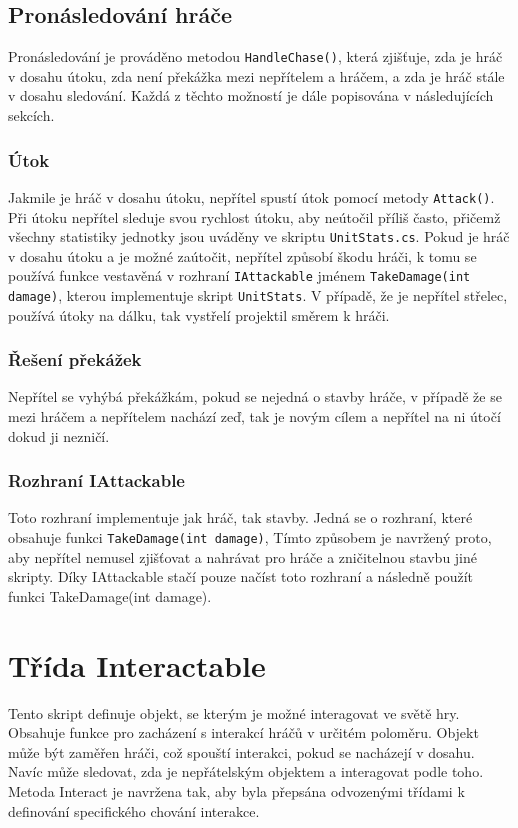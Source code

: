 \subsection{Pronásledování hráče}
Pronásledování je prováděno metodou \texttt{HandleChase()}, která zjišťuje, zda je hráč v dosahu útoku, zda není překážka mezi nepřítelem a hráčem, a zda je hráč stále v dosahu sledování. Každá z těchto možností je dále popisována v následujících sekcích.

\subsubsection{Útok}
Jakmile je hráč v dosahu útoku, nepřítel spustí útok pomocí metody \texttt{Attack()}. Při útoku nepřítel sleduje svou rychlost útoku, aby neútočil příliš často, přičemž všechny statistiky jednotky jsou uváděny ve skriptu \texttt{UnitStats.cs}. Pokud je hráč v dosahu útoku a je možné zaútočit, nepřítel způsobí škodu hráči, k tomu se používá funkce vestavěná v rozhraní \texttt{IAttackable} jménem \texttt{TakeDamage(int damage)}, kterou implementuje skript \texttt{UnitStats}. V případě, že je nepřítel střelec, používá útoky na dálku, tak vystřelí projektil směrem k hráči.

\subsubsection{Řešení překážek}
Nepřítel se vyhýbá překážkám, pokud se nejedná o stavby hráče, v případě že se mezi hráčem a nepřítelem nachází zeď, tak je novým cílem a nepřítel na ni útočí dokud ji nezničí.

\subsubsection{Rozhraní IAttackable}
Toto rozhraní implementuje jak hráč, tak stavby. Jedná se o rozhraní, které obsahuje funkci \texttt{TakeDamage(int damage)}, Tímto způsobem je navržený proto, aby nepřítel nemusel zjišťovat a nahrávat pro hráče a zničitelnou stavbu jiné skripty. Díky IAttackable stačí pouze načíst toto rozhraní a následně použít funkci TakeDamage(int damage).

\section{Třída Interactable}
Tento skript definuje objekt, se kterým je možné interagovat ve světě hry. Obsahuje funkce pro zacházení s interakcí hráčů v určitém poloměru. Objekt může být zaměřen hráči, což spouští interakci, pokud se nacházejí v dosahu. Navíc může sledovat, zda je nepřátelským objektem a interagovat podle toho. Metoda Interact je navržena tak, aby byla přepsána odvozenými třídami k definování specifického chování interakce.

